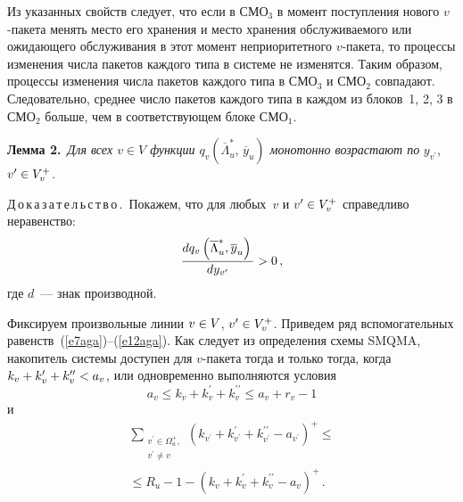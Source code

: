 \begin{multicols}{2}
     Из указанных свойств следует, что если в СМО$_3$ в момент 
поступления нового $v$-пакета менять мес\-то его хранения и место хранения 
обслуживаемого или ожидающего обслуживания в этот момент 
неприоритетного $v$-пакета, то процессы изменения числа пакетов каждого 
типа в системе не изменятся. Таким образом, процессы изменения числа 
пакетов каждого типа в СМО$_3$ и СМО$_2$ совпадают. Следовательно, 
среднее число пакетов каждого типа в каждом из блоков~1, 2, 3 в СМО$_2$ 
больше, чем в соответствующем блоке СМО$_1$. 
     
     \medskip
     
     \noindent
     \textbf{Лемма 2.}\ \textit{Для всех $v\in V$ функции 
$q_v(\overline{\Lambda}_u^*,\,\overline{y}_u)$ монотонно возрастают по} 
$y_{v^\prime}$, $v^\prime\hm\in V_v^+$.
     
     \medskip
     
     \noindent
     Д\,о\,к\,а\,з\,а\,т\,е\,л\,ь\,с\,т\,в\,о\,.\ Покажем, что для любых~$v$ и 
$v^\prime\hm\in V_v^+$ справедливо неравенство:
     \begin{equation}
     \displaystyle\frac{\displaystyle dq_v\left(\overline{\Lambda}_u^*, \overline{y}_u 
\right)\mathstrut}{\displaystyle dy_{v^\prime}\mathstrut}>0\,,
     \label{e6aga}
     \end{equation}
где $d$~--- знак производной. 
     
     Фиксируем произвольные линии $v\hm\in V$, $v^\prime\hm\in V_v^+$. 
Приведем ряд вспомогательных равенств~(\ref{e7aga})--(\ref{e12aga}). Как 
следует из определения схемы SMQMA, накопитель системы доступен для 
     $v$-пакета тогда и только тогда, когда 
$k_v\hm+k_v^\prime\hm+k_v^{\prime\prime}\hm<a_v$, или одновременно 
выполняются условия 
$$
a_v\leq  k_v+k_v^\prime+k_v^{\prime\prime}\leq a_v+r_v-1
$$ 
и 
\begin{multline*}
\sum\limits_{\substack{{v^\prime\in\Omega_u^+,}\\{v^\prime\not=v}}}\left( 
k_{v^\prime}+k^\prime_{v^\prime}+k_{v^\prime}^{\prime\prime} - 
a_{v^\prime}\right)^+\leq{}\\
{}\leq R_u-1-
\left(k_v+k_v^\prime+k_v^{\prime\prime}-a_v\right)^+\,.
\end{multline*}
     

\end{multicols}
